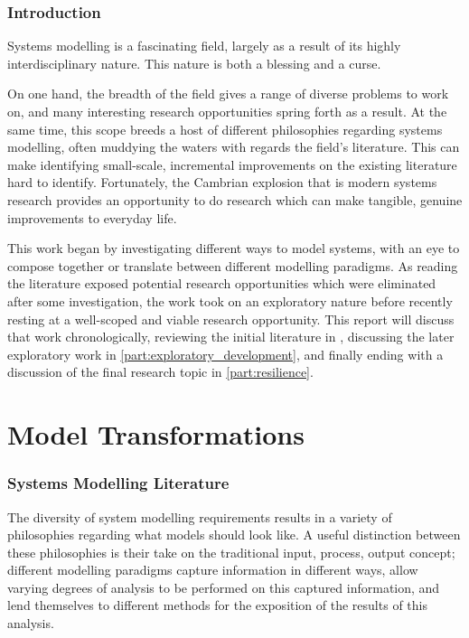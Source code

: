\documentclass[draft]{article}
\begin{document}
\maketitle


\section{Introduction}
\label{sec:introduction}
Systems modelling is a fascinating field, largely as a result of its highly
interdisciplinary nature. This nature is both a blessing and a curse.\par

On one hand, the breadth of the field gives a range of diverse problems to work
on, and many interesting research opportunities spring forth as a result. At the
same time, this scope breeds a host of different philosophies regarding systems
modelling, often muddying the waters with regards the field's literature. This
can make identifying small-scale, incremental improvements on the existing
literature hard to identify. Fortunately, the Cambrian explosion that is modern
systems research provides an opportunity to do research which can make tangible,
genuine improvements to everyday life.\par

This work began by investigating different ways to model systems, with an eye to
compose together or translate between different modelling paradigms. As reading
the literature exposed potential research opportunities which were eliminated
after some investigation, the work took on an exploratory nature before recently
resting at a well-scoped and viable research opportunity. This report will
discuss that work chronologically, reviewing the initial literature in
\cref{part:model_transformations}, discussing the later exploratory work in
\cref{part:exploratory_development}, and finally ending with a discussion of the
final research topic in \cref{part:resilience}.


\part{Model Transformations}
\label{part:model_transformations}
\section{Systems Modelling Literature}
\label{sec:literature}
The diversity of system modelling requirements results in a variety of
philosophies regarding what models should look like. A useful distinction
between these philosophies is their take on the traditional input, process,
output concept; different modelling paradigms capture information in
different ways, allow varying degrees of analysis to be performed on this
captured information, and lend themselves to different methods for the
exposition of the results of this analysis.\par
\end{document}
